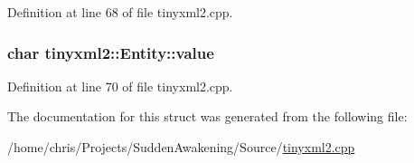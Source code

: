 Definition at line 68 of file tinyxml2.\-cpp.

\hypertarget{structtinyxml2_1_1_entity_a7334e81e33b4615655a403711b24f3ed}{
\subsubsection[{value}]{\setlength{\rightskip}{0pt plus 5cm}char tinyxml2\-::\-Entity\-::value}}\label{structtinyxml2_1_1_entity_a7334e81e33b4615655a403711b24f3ed}


Definition at line 70 of file tinyxml2.\-cpp.



The documentation for this struct was generated from the following file\-:\begin{DoxyCompactItemize}
\item 
/home/chris/\-Projects/\-Sudden\-Awakening/\-Source/\hyperlink{tinyxml2_8cpp}{tinyxml2.\-cpp}\end{DoxyCompactItemize}
